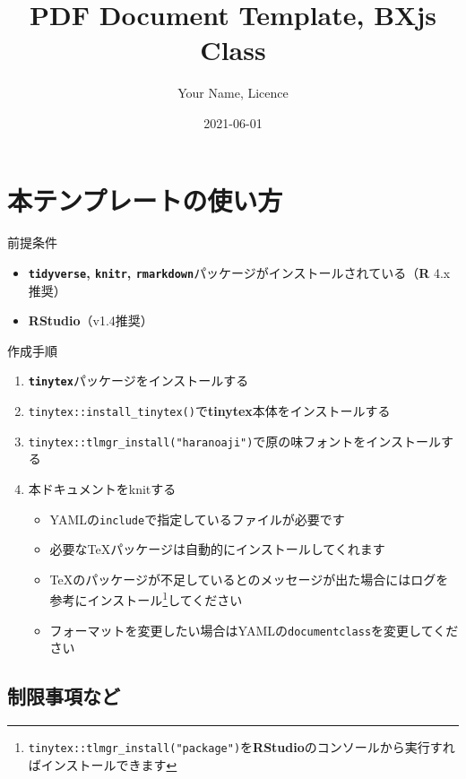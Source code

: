 \documentclass[
  12pt,
  a4paper,xelatex,ja=standard]{bxjsarticle}
\title{PDF Document Template, BXjs Class}
\author{Your Name, Licence}
\date{2021-06-01}
\providecommand{\tightlist}{%
  \setlength{\itemsep}{0pt}\setlength{\parskip}{0pt}}
\begin{document}
\maketitle

\hypertarget{ux672cux30c6ux30f3ux30d7ux30ecux30fcux30c8ux306eux4f7fux3044ux65b9}{%
\section{本テンプレートの使い方}\label{ux672cux30c6ux30f3ux30d7ux30ecux30fcux30c8ux306eux4f7fux3044ux65b9}}

前提条件

\begin{itemize}
\tightlist
\item
  \textbf{\texttt{tidyverse}, \texttt{knitr},
  \texttt{rmarkdown}}パッケージがインストールされている（\textbf{R}
  4.x推奨）
\item
  \textbf{RStudio}（v1.4推奨）
\end{itemize}

作成手順

\begin{enumerate}
\def\labelenumi{\arabic{enumi}.}
\tightlist
\item
  \textbf{\texttt{tinytex}}パッケージをインストールする
\item
  \texttt{tinytex::install\_tinytex()}で\textbf{tinytex}本体をインストールする
\item
  \texttt{tinytex::tlmgr\_install("haranoaji")}で原の味フォントをインストールする
\item
  本ドキュメントをknitする

  \begin{itemize}
  \tightlist
  \item
    YAMLの\texttt{include}で指定しているファイルが必要です
  \item
    必要なTeXパッケージは自動的にインストールしてくれます
  \item
    TeXのパッケージが不足しているとのメッセージが出た場合にはログを参考にインストール\footnote{\texttt{tinytex::tlmgr\_install("package")}を\textbf{RStudio}のコンソールから実行すればインストールできます}してください
  \item
    フォーマットを変更したい場合はYAMLの\texttt{documentclass}を変更してください
  \end{itemize}
\end{enumerate}

\newpage

\hypertarget{ux5236ux9650ux4e8bux9805ux306aux3069}{%
\subsection{制限事項など}\label{ux5236ux9650ux4e8bux9805ux306aux3069}}
\end{document}
